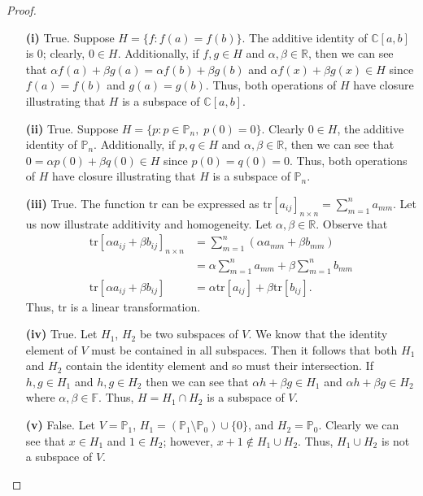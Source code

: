 \documentclass[ 12pt ]{article}
\begin{document}
\begin{enumerate}
		\begin{proof}
			\begin{enumerate}
				\item[\textbf{(i)}] True. Suppose $H = \{ f : f(a) = f(b) \}$. The additive identity of $\mathbb{C}[a,b]$ is 0; clearly, $0 \in H$. Additionally, if $f, g \in H$ and
					$\alpha, \beta \in \mathbb{R}$, then we can see that $\alpha f(a) + \beta g(a) = \alpha f(b) + \beta g(b)$ and $\alpha f(x) + \beta g(x) \in H$ since $f(a) = f(b)$
					and $g(a) = g(b)$. Thus, both operations of $H$ have closure illustrating that $H$ is a subspace of $\mathbb{C}[a,b]$.

				\item[\textbf{(ii)}] True. Suppose $H = \{ p : p \in \mathbb{P}_n,\; p(0) = 0 \}$. Clearly $0 \in H$, the additive identity of $\mathbb{P}_n$. Additionally, if
					$p, q \in H$ and $\alpha, \beta \in \mathbb{R}$, then we can see that $0 = \alpha p(0) + \beta q(0) \in H$ since $p(0) = q(0) = 0$. Thus, both operations of
					$H$ have closure illustrating that $H$ is a subspace of $\mathbb{P}_n$.

				\item[\textbf{(iii)}] True. The function $\mathrm{tr}$ can be expressed as $\mathrm{tr}[a_{ij}]_{n \times n} = \sum_{m=1}^n a_{mm}$. Let us now illustrate additivity
					and homogeneity. Let $\alpha, \beta \in \mathbb{R}$. Observe that
					\begin{align*}
						\mathrm{tr}[\alpha a_{ij} + \beta b_{ij}]_{n \times n} &= \sum_{m=1}^n (\alpha a_{mm} + \beta b_{mm}) \\
						&= \alpha \sum_{m=1}^n a_{mm} + \beta \sum_{m=1}^n b_{mm} \\
						\mathrm{tr}[\alpha a_{ij} + \beta b_{ij}] &= \alpha\mathrm{tr}[a_{ij}] + \beta \mathrm{tr}[b_{ij}].
					\end{align*}
					Thus, $\mathrm{tr}$ is a linear transformation.

				\item[\textbf{(iv)}] True. Let $H_1$, $H_2$ be two subspaces of $V$. We know that the identity element of $V$ must be contained in all subspaces. Then it follows that
					both $H_1$ and $H_2$ contain the identity element and so must their intersection. If $h, g \in H_1$ and $h, g \in H_2$ then we can see that $\alpha h + \beta g
					\in H_1$ and $\alpha h + \beta g \in H_2$ where $\alpha, \beta \in \mathbb{F}$. Thus, $H = H_1 \cap H_2$ is a subspace of $V$.

				\item[\textbf{(v)}] False. Let $V = \mathbb{P}_1$, $H_1 = \left ( \mathbb{P}_1 \setminus \mathbb{P}_0 \right ) \cup \{ 0 \}$, and $H_2 = \mathbb{P}_0$. Clearly we can
					see that $x \in H_1$ and $1 \in H_2$; however, $x+1 \notin H_1 \cup H_2$. Thus, $H_1 \cup H_2$ is not a subspace of $V$.
			\end{enumerate}
		\end{proof}
		\newpage



\end{enumerate}
\end{document}
